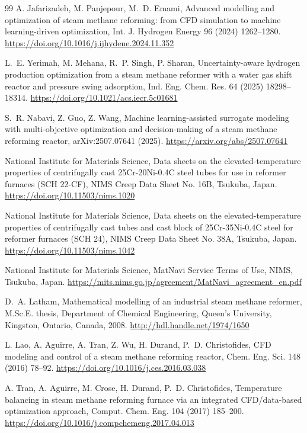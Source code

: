 \documentclass[final,3p,times]{elsarticle}
\begin{document}
\begin{thebibliography}{99}
 A. Jafarizadeh, M. Panjepour, M.~D. Emami, Advanced modelling and optimization of steam methane reforming: from CFD simulation to machine learning-driven optimization, Int. J. Hydrogen Energy 96 (2024) 1262--1280. \url{https://doi.org/10.1016/j.ijhydene.2024.11.352}

 L.~E. Yerimah, M. Mehana, R.~P. Singh, P. Sharan, Uncertainty-aware hydrogen production optimization from a steam methane reformer with a water gas shift reactor and pressure swing adsorption, Ind. Eng. Chem. Res. 64 (2025) 18298--18314. \url{https://doi.org/10.1021/acs.iecr.5c01681}

 S.~R. Nabavi, Z. Guo, Z. Wang, Machine learning-assisted surrogate modeling with multi-objective optimization and decision-making of a steam methane reforming reactor, arXiv:2507.07641 (2025). \url{https://arxiv.org/abs/2507.07641}

 National Institute for Materials Science, Data sheets on the elevated-temperature properties of centrifugally cast 25Cr-20Ni-0.4C steel tubes for use in reformer furnaces (SCH 22-CF), NIMS Creep Data Sheet No. 16B, Tsukuba, Japan. \url{https://doi.org/10.11503/nims.1020}

 National Institute for Materials Science, Data sheets on the elevated-temperature properties of centrifugally cast tubes and cast block of 25Cr-35Ni-0.4C steel for reformer furnaces (SCH 24), NIMS Creep Data Sheet No. 38A, Tsukuba, Japan. \url{https://doi.org/10.11503/nims.1042}

 National Institute for Materials Science, MatNavi Service Terms of Use, NIMS, Tsukuba, Japan. \url{https://mits.nims.go.jp/agreement/MatNavi_agreement_en.pdf}

 D.~A. Latham, Mathematical modelling of an industrial steam methane reformer, M.Sc.E. thesis, Department of Chemical Engineering, Queen's University, Kingston, Ontario, Canada, 2008. \url{http://hdl.handle.net/1974/1650}

 L. Lao, A. Aguirre, A. Tran, Z. Wu, H. Durand, P.~D. Christofides, CFD modeling and control of a steam methane reforming reactor, Chem. Eng. Sci. 148 (2016) 78--92. \url{https://doi.org/10.1016/j.ces.2016.03.038}

 A. Tran, A. Aguirre, M. Crose, H. Durand, P.~D. Christofides, Temperature balancing in steam methane reforming furnace via an integrated CFD/data-based optimization approach, Comput. Chem. Eng. 104 (2017) 185--200. \url{https://doi.org/10.1016/j.compchemeng.2017.04.013}


\end{thebibliography}
\end{document}
